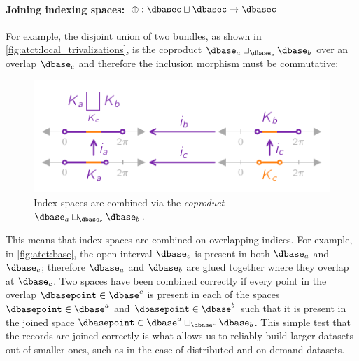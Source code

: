 \documentclass[journal]{IEEEtran}
\theoremstyle{definition}
\theoremstyle{remark}
\begin{document}
\paragraph{Joining indexing spaces: $\oplus: \mathcal{\dbasec} \sqcup \mathcal{\dbasec} \rightarrow \mathcal{\dbasec}$}
For example, the disjoint union of two bundles, as shown in \autoref{fig:atct:local_trivalizations}, is the coproduct $\dbase_{a} \sqcup_{\dbase_{c}} \dbase_{b}$ over an overlap $\dbase_{c}$ and therefore the inclusion morphism must be commutative:
\begin{figure}[h]
  \includegraphics*[width=1\columnwidth]{figures/tex/k_coproduct.pdf}  \caption{Index spaces are combined via the \textit{coproduct} $\dbase_{a}\sqcup_{\dbase_c} \dbase_{b}$.}
  \label{fig:atct:base}
\end{figure}

This means that index spaces are combined on overlapping indices. For example, in \autoref{fig:atct:base}, the open interval $\dbase_c$ is present in both $\dbase_a$ and $\dbase_c$; therefore $\dbase_a$ and $\dbase_b$ are glued together where they overlap at $\dbase_c$.  Two spaces have been combined correctly if every point in the overlap  $\dbasepoint \in \dbase^{c}$ is present in each of the spaces $\dbasepoint \in \dbase^{a}$ and $\dbasepoint \in \dbase^{b}$ such that it is present in the joined space $\dbasepoint \in \dbase^{a}\sqcup_{\dbase^{c}} \dbase_{b}$. This simple test that the records are joined correctly is what allows us to reliably build larger datasets out of smaller ones, such as in the case of distributed and on demand datasets.
\end{document}
